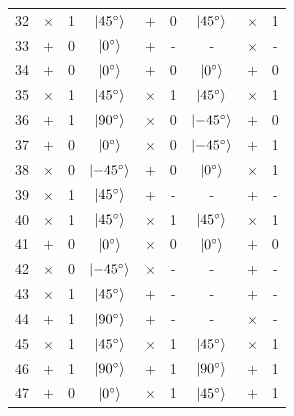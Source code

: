 \begin{longtable}{c|ccc|ccc|cc}
  \rowcolor{orange!20} 32 & $\times$ & 1 & $\ket{\SI{+45}{\degree}}$
  & $+$      & 0 & $\ket{\SI{+45}{\degree}}$ & $\times$ & 1 \\
  33                                      & $+$      & 0 &
  $\ket{\SI{0}{\degree}}$   & $+$      & - & -
  & $\times$ & - \\
  \rowcolor{blue!20} 34 & $+$      & 0 & $\ket{\SI{0}{\degree}}$
  & $+$      & 0 & $\ket{\SI{0}{\degree}}$   & $+$      & 0 \\
  \rowcolor{blue!20} 35 & $\times$ & 1 & $\ket{\SI{+45}{\degree}}$
  & $\times$ & 1 & $\ket{\SI{+45}{\degree}}$ & $\times$ & 1 \\
  \rowcolor{red!20} 36 & $+$      & 1 & $\ket{\SI{90}{\degree}}$
  & $\times$ & 0 & $\ket{\SI{-45}{\degree}}$  & $+$      & 0 \\
  \rowcolor{red!20} 37 & $+$      & 0 & $\ket{\SI{0}{\degree}}$
  & $\times$ & 0 & $\ket{\SI{-45}{\degree}}$   & $+$      & 1 \\
  \rowcolor{red!20} 38 & $\times$ & 0 & $\ket{\SI{-45}{\degree}}$
  & $+$      & 0 & $\ket{\SI{0}{\degree}}$ & $\times$ & 1 \\
  39                                      & $\times$ & 1 &
  $\ket{\SI{45}{\degree}}$  & $+$      & - & -
  & $+$      & - \\
  \rowcolor{blue!20} 40 & $\times$ & 1 & $\ket{\SI{45}{\degree}}$
  & $\times$ & 1 & $\ket{\SI{45}{\degree}}$  & $\times$ & 1 \\
  \rowcolor{orange!20} 41 & $+$      & 0 & $\ket{\SI{0}{\degree}}$
  & $\times$ & 0 & $\ket{\SI{0}{\degree}}$   & $+$      & 0 \\
  42                                      & $\times$ & 0 &
  $\ket{\SI{-45}{\degree}}$ & $\times$ & - & -
  & $+$      & - \\
  43                                      & $\times$ & 1 &
  $\ket{\SI{+45}{\degree}}$ & $+$      & - & -
  & $+$      & - \\
  44                                      & $+$      & 1 &
  $\ket{\SI{90}{\degree}}$  & $+$      & - & -
  & $\times$ & - \\
  \rowcolor{blue!20} 45 & $\times$ & 1 & $\ket{\SI{45}{\degree}}$
  & $\times$ & 1 & $\ket{\SI{45}{\degree}}$  & $\times$ & 1 \\
  \rowcolor{blue!20} 46 & $+$      & 1 & $\ket{\SI{90}{\degree}}$
  & $+$      & 1 & $\ket{\SI{90}{\degree}}$  & $+$      & 1 \\
  \rowcolor{red!20} 47 & $+$      & 0 & $\ket{\SI{0}{\degree}}$
  & $\times$ & 1 & $\ket{\SI{45}{\degree}}$   & $+$      & 1 \\

\end{longtable}
